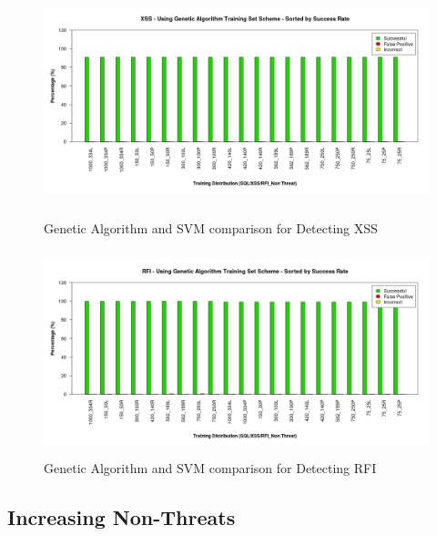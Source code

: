 \begin{appendices}
\begin{figure}[hp]
	\centering
	\includegraphics[height=225px]{./assets/appendix/fullresults/svm/comparison/Results_XSS.png}
	\caption{Genetic Algorithm and SVM comparison for Detecting XSS}
	\includegraphics[height=225px]{./assets/appendix/fullresults/svm/comparison/Results_RFI.png}
	\caption{Genetic Algorithm and SVM comparison for Detecting RFI}
\end{figure}

\newpage
\subsection{Increasing Non-Threats}  \label{app:resNonThreat}


\end{appendices}
